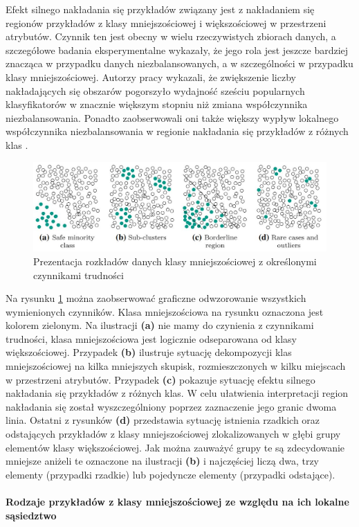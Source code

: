 \noindent Efekt silnego nakładania się przykładów związany jest z nakładaniem się regionów przykładów z klasy mniejszościowej i większościowej w przestrzeni atrybutów. Czynnik ten jest obecny w wielu rzeczywistych zbiorach danych, a szczegółowe badania eksperymentalne wykazały, że jego rola jest jeszcze bardziej znacząca w przypadku danych niezbalansowanych, a w szczególności w przypadku klasy mniejszościowej. Autorzy pracy \cite{Article:DataDistribution4} wykazali, że zwiększenie liczby nakładających się obszarów pogorszyło wydajność sześciu popularnych klasyfikatorów w znacznie większym stopniu niż zmiana współczynnika niezbalansowania. Ponadto zaobserwowali oni także większy wypływ lokalnego współczynnika niezbalansowania w regionie nakładania się przykładów z różnych klas \cite{Article:TypyPrzykladow}.

\begin{figure}[h] 
    \centering
    \includegraphics[width=15cm]{figures/data_examples.JPG}
    \caption{Prezentacja rozkładów danych klasy mniejszościowej z określonymi czynnikami trudności \cite{Article:TypyPrzykladow}}\label{Figure:TypesExample}
\end{figure}

\noindent Na rysunku \ref{Figure:TypesExample} można zaobserwować graficzne odwzorowanie wszystkich wymienionych czynników. Klasa mniejszościowa na rysunku oznaczona jest kolorem zielonym. Na ilustracji \textbf{(a)} nie mamy do czynienia z czynnikami trudności, klasa mniejszościowa jest logicznie odseparowana od klasy większościowej. Przypadek \textbf{(b)} ilustruje sytuację dekompozycji klas mniejszościowej na kilka mniejszych skupisk, rozmieszczonych w kilku miejscach w przestrzeni atrybutów. Przypadek \textbf{(c)} pokazuje sytuację efektu silnego nakładania się przykładów z różnych klas. W celu ułatwienia interpretacji region nakładania się został wyszczególniony poprzez zaznaczenie jego granic dwoma linia. Ostatni z rysunków \textbf{(d)} przedstawia sytuację istnienia rzadkich oraz odstających przykładów z klasy mniejszościowej zlokalizowanych w głębi grupy elementów klasy większościowej. Jak można zauważyć grupy te są zdecydowanie mniejsze aniżeli te oznaczone na ilustracji \textbf{(b)} i najczęściej liczą dwa, trzy elementy (przypadki rzadkie) lub pojedyncze elementy (przypadki odstające).\\\\
\textbf{Rodzaje przykładów z klasy mniejszościowej ze względu na ich lokalne sąsiedztwo}\\

